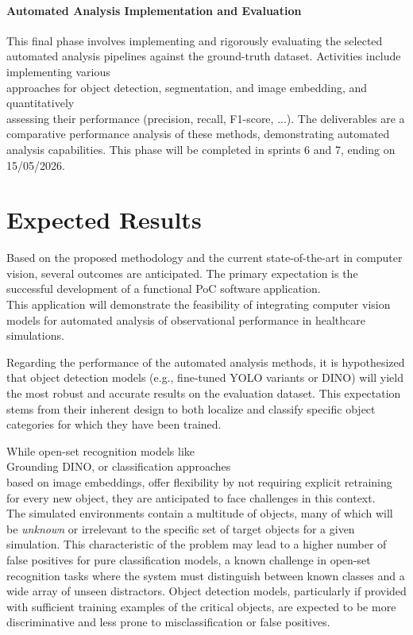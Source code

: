 \documentclass[english]{hogent-article}
\begin{document}
\paragraph{Automated Analysis Implementation and Evaluation\\}
This final phase involves implementing and rigorously evaluating the selected automated analysis pipelines 
against the ground-truth dataset.
Activities include implementing various\\ approaches for object detection, segmentation, and image embedding, and quantitatively\\
assessing their performance (precision, recall, F1-score, ...).
The deliverables are a comparative performance analysis of these methods, demonstrating automated analysis capabilities.
This phase will be completed in sprints 6 and 7, ending on 15/05/2026.

\section{Expected Results}
\label{sec:expected-results}

Based on the proposed methodology and the current state-of-the-art in computer vision, several outcomes are anticipated.
The primary expectation is the successful development of a functional PoC software application.\\
This application will demonstrate the feasibility of integrating computer vision models for automated analysis of observational performance in healthcare simulations.

Regarding the performance of the automated analysis methods, it is hypothesized that object detection models (e.g., fine-tuned YOLO variants or DINO) will yield the most robust and accurate results on the evaluation dataset.
This expectation stems from their inherent design to both localize and classify specific object categories for which they have been trained.

While open-set recognition models like\\ Grounding DINO, or classification approaches\\ based on image embeddings, offer flexibility by not requiring explicit retraining for every new object, they are anticipated to face challenges in this context.\\
The simulated environments contain a multitude of objects, many of which will be \textit{unknown} or irrelevant to the specific set of target objects for a given simulation.
This characteristic of the problem may lead to a higher number of false positives for pure classification models, a known challenge in open-set recognition tasks where the system must distinguish between known classes and a wide array of unseen distractors.
Object detection models, particularly if provided with sufficient training examples of the critical objects, are expected to be more discriminative and less prone to misclassification or false positives.
\end{document}
